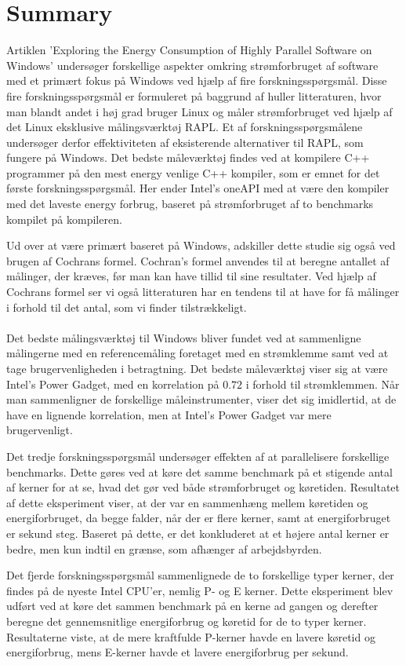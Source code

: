\section*{Summary}

Artiklen 'Exploring the Energy Consumption of Highly Parallel Software on Windows' undersøger forskellige aspekter omkring strømforbruget af software med et primært fokus på Windows ved hjælp af fire forskningsspørgsmål. Disse fire forskningsspørgsmål er formuleret på baggrund af huller litteraturen, hvor man blandt andet i høj grad bruger Linux og måler strømforbruget ved hjælp af det Linux eksklusive målingsværktøj RAPL. Et af forskningsspørgsmålene undersøger derfor effektiviteten af eksisterende alternativer til RAPL, som fungere på Windows. Det bedste måleværktøj findes ved at kompilere C++ programmer på den mest energy venlige C++ kompiler, som er emnet for det første forskningsspørgsmål. Her ender Intel's oneAPI med at være den kompiler med det laveste energy forbrug, baseret på strømforbruget af to benchmarks kompilet på kompileren.


Ud over at være primært baseret på Windows, adskiller dette studie sig også ved brugen af Cochrans formel. Cochran's formel anvendes til at beregne antallet af målinger, der kræves, før man kan have tillid til sine resultater. Ved hjælp af Cochrans formel ser vi også litteraturen har en tendens til at have for få målinger i forhold til det antal, som vi finder tilstrækkeligt.


\paragraph{}
Det bedste målingsværktøj til Windows bliver fundet ved at sammenligne målingerne med en referencemåling foretaget med en strømklemme samt ved at tage brugervenligheden i betragtning. Det bedste måleværktøj viser sig at være  Intel's Power Gadget, med en korrelation på $0.72$ i forhold til strømklemmen. Når man sammenligner de forskellige måleinstrumenter, viser det sig imidlertid, at de have en lignende korrelation, men at Intel's Power Gadget var mere brugervenligt.


Det tredje forskningsspørgsmål undersøger effekten af at parallelisere forskellige benchmarks. Dette gøres ved at køre det samme benchmark på et stigende antal af kerner for at se, hvad det gør ved både strømforbruget og køretiden. Resultatet af dette eksperiment viser, at der var en sammenhæng mellem køretiden og energiforbruget, da begge falder, når der er flere kerner, samt at energiforbruget er sekund steg. Baseret på dette, er det konkluderet at et højere antal kerner er bedre, men kun indtil en grænse, som afhænger af arbejdsbyrden.


Det fjerde forskningsspørgsmål sammenlignede de to forskellige typer kerner, der findes på de nyeste Intel CPU'er, nemlig P- og E kerner. Dette eksperiment blev udført ved at køre det sammen benchmark på en kerne ad gangen og derefter beregne det gennemsnitlige energiforbrug og køretid for de to typer kerner. Resultaterne viste, at de mere kraftfulde P-kerner havde en lavere køretid og energiforbrug, mens E-kerner havde et lavere energiforbrug per sekund.
